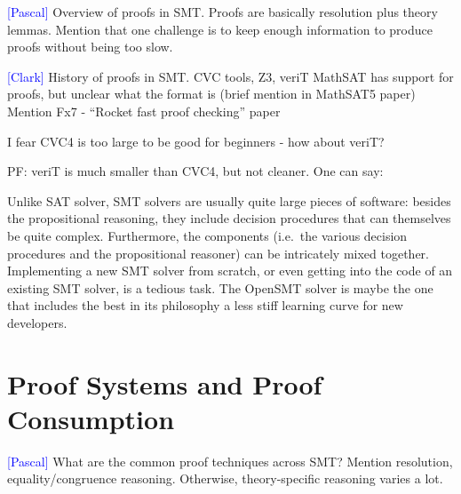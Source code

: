 \documentclass{llncs}
\newcommand{\Note}[1]{\textcolor{blue}{[#1]}}
\begin{document}
\Note{Pascal}
Overview of proofs in SMT.  Proofs are basically resolution plus theory
lemmas.  Mention that one challenge is to keep enough information to produce
proofs without being too slow.

\Note{Clark}
History of proofs in SMT.  CVC tools, Z3, veriT
MathSAT has support for proofs, but unclear what the format is (brief mention
in MathSAT5 paper)
Mention Fx7 - ``Rocket fast proof checking'' paper

I fear CVC4 is too large to be good for beginners - how about veriT?

PF: veriT is much smaller than CVC4, but not cleaner.  One can say:

Unlike SAT solver, SMT solvers are usually quite large pieces of software:
besides the propositional reasoning, they include decision procedures that can
themselves be quite complex.  Furthermore, the components (i.e.\ the various
decision procedures and the propositional reasoner) can be intricately mixed
together.  Implementing a new SMT solver from scratch, or even getting into the
code of an existing SMT solver, is a tedious task.  The OpenSMT solver is maybe
the one that includes the best in its philosophy a less stiff learning curve for
new developers.

\section{Proof Systems and Proof Consumption}

\Note{Pascal}
What are the common proof techniques across SMT?  Mention resolution,
equality/congruence reasoning.  Otherwise, theory-specific reasoning varies a lot.
\end{document}
